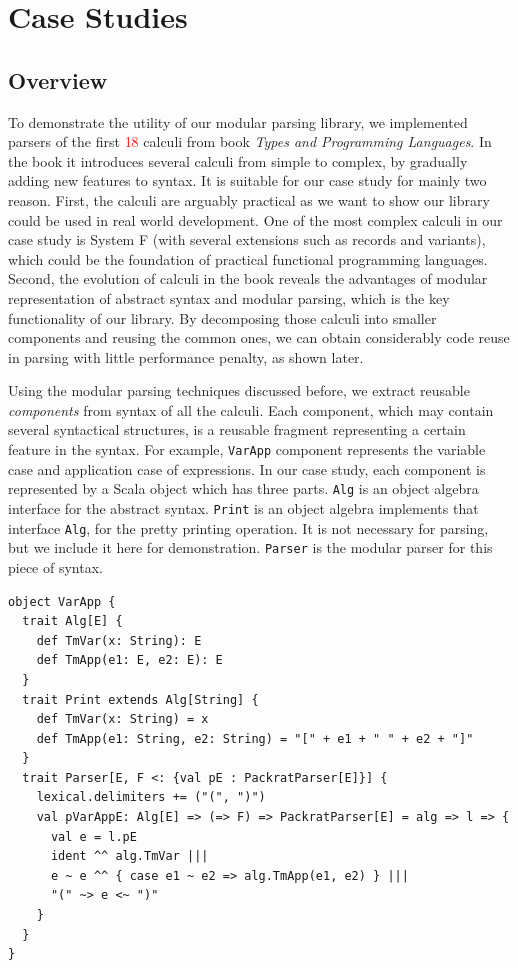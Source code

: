 \section{Case Studies}\label{sec:casestudy}

\subsection{Overview}\label{subsec:cs-overview}

To demonstrate the utility of our modular parsing library, we implemented parsers of the first \textcolor{red}{18} calculi from book \textit{Types and Programming Languages}. In the book it introduces several calculi from simple to complex, by gradually adding new features to syntax. It is suitable for our case study for mainly two reason. First, the calculi are arguably practical as we want to show our library could be used in real world development. One of the most complex calculi in our case study is System F (with several extensions such as records and variants), which could be the foundation of practical functional programming languages. Second, the evolution of calculi in the book reveals the advantages of modular representation of abstract syntax and modular parsing, which is the key functionality of our library. By decomposing those calculi into smaller components and reusing the common ones, we can obtain considerably code reuse in parsing with little performance penalty, as shown later.

Using the modular parsing techniques discussed before, we extract reusable \textit{components} from syntax of all the calculi. Each component, which may contain several syntactical structures, is a reusable fragment representing a certain feature in the syntax. For example, \lstinline{VarApp} component represents the variable case and application case of expressions. In our case study, each component is represented by a Scala object which has three parts. \lstinline{Alg} is an object algebra interface for the abstract syntax. \lstinline{Print} is an object algebra implements that interface \lstinline{Alg}, for the pretty printing operation. It is not necessary for parsing, but we include it here for demonstration. \lstinline{Parser} is the modular parser for this piece of syntax.

\begin{lstlisting}
object VarApp {
  trait Alg[E] {
    def TmVar(x: String): E
    def TmApp(e1: E, e2: E): E
  }
  trait Print extends Alg[String] {
    def TmVar(x: String) = x
    def TmApp(e1: String, e2: String) = "[" + e1 + " " + e2 + "]"
  }
  trait Parser[E, F <: {val pE : PackratParser[E]}] {
    lexical.delimiters += ("(", ")")
    val pVarAppE: Alg[E] => (=> F) => PackratParser[E] = alg => l => {
      val e = l.pE
      ident ^^ alg.TmVar |||
      e ~ e ^^ { case e1 ~ e2 => alg.TmApp(e1, e2) } |||
      "(" ~> e <~ ")"
    }
  }
}
\end{lstlisting}

